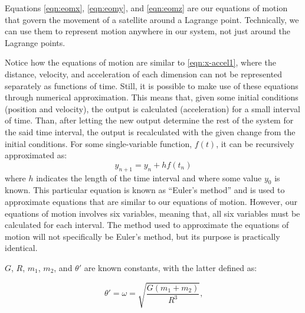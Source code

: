 Equations \eqref{eqn:eomx}, \eqref{eqn:eomy}, and \eqref{eqn:eomz} are our equations of motion that govern the movement of a satellite around a Lagrange point.
Technically, we can use them to represent motion anywhere in our system, not just around the Lagrange points.

Notice how the equations of motion are similar to \eqref{eqn:x-accel1}, where the distance, velocity, and acceleration of each dimension can not be represented separately as functions of time.
Still, it is possible to make use of these equations through numerical approximation.
This means that, given some initial conditions (position and velocity), the output is calculated (acceleration) for a small interval of time.
Than, after letting the new output determine the rest of the system for the said time interval, the output is recalculated with the given change from the initial conditions.
For some single-variable function, $f(t)$, it can be recursively approximated as:
\begin{equation*}
	y_{n+1} = y_n + hf(t_n)
\end{equation*}
where $h$ indicates the length of the time interval and where some value $y_0$ is known.
This particular equation is known as ``Euler's method''\autocite{BrilEulers} and is used to approximate equations that are similar to our equations of motion.
However, our equations of motion involves six variables, meaning that, all six variables must be calculated for each interval.
The method used to approximate the equations of motion will not specifically be Euler's method, but its purpose is practically identical.

$G$, $R$, $m_1$, $m_2$, and $\theta'$ are known constants, with the latter defined as:

\begin{equation*}
	\theta' = \omega = \sqrt{\frac{G(m_1 + m_2)}{R^3}} \text{,}
\end{equation*}

